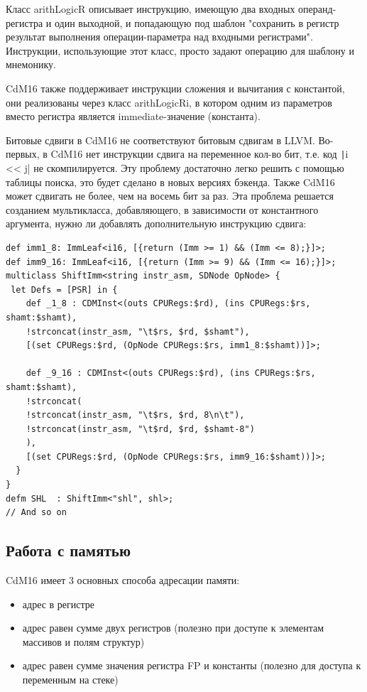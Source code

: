 \documentclass[a4paper,14pt]{extarticle}
\begin{document}
Класс arithLogicR описывает инструкцию, имеющую два входных операнд-регистра и один выходной, и попадающую под шаблон "сохранить в регистр результат выполнения операции-параметра над входными регистрами". Инструкции, использующие этот класс, просто задают операцию для шаблону и мнемонику.

CdM16 также поддерживает инструкции сложения и вычитания с константой, они реализованы через класс arithLogicRi, в котором одним из параметров вместо регистра является immediate-значение (константа).

Битовые сдвиги в CdM16 не соответствуют битовым сдвигам в LLVM. Во-первых, в CdM16 нет инструкции сдвига на переменное кол-во бит, т.е. код \texttt|i << j| не скомпилируется. Эту проблему достаточно легко решить с помощью таблицы поиска, это будет сделано в новых версиях бэкенда. Также CdM16 может сдвигать не более, чем на восемь бит за раз. Эта проблема решается созданием мультикласса, добавляющего, в зависимости от константного аргумента, нужно ли добавлять дополнительную инструкцию сдвига:
\begin{verbatim}
def imm1_8: ImmLeaf<i16, [{return (Imm >= 1) && (Imm <= 8);}]>;
def imm9_16: ImmLeaf<i16, [{return (Imm >= 9) && (Imm <= 16);}]>;
multiclass ShiftImm<string instr_asm, SDNode OpNode> {
 let Defs = [PSR] in {
	def _1_8 : CDMInst<(outs CPURegs:$rd), (ins CPURegs:$rs, shamt:$shamt),
	!strconcat(instr_asm, "\t$rs, $rd, $shamt"),
	[(set CPURegs:$rd, (OpNode CPURegs:$rs, imm1_8:$shamt))]>;
	
	def _9_16 : CDMInst<(outs CPURegs:$rd), (ins CPURegs:$rs, shamt:$shamt),
	!strconcat(
	!strconcat(instr_asm, "\t$rs, $rd, 8\n\t"),
	!strconcat(instr_asm, "\t$rd, $rd, $shamt-8")
	),
	[(set CPURegs:$rd, (OpNode CPURegs:$rs, imm9_16:$shamt))]>;
  }
}
defm SHL  : ShiftImm<"shl", shl>;
// And so on
\end{verbatim}

\subsection{Работа с памятью}
CdM16 имеет 3 основных способа адресации памяти:
\begin{itemize}
	\item адрес в регистре
	\item адрес равен сумме двух регистров (полезно при доступе к элементам массивов и полям структур)
	\item адрес равен сумме значения регистра FP и константы (полезно для доступа к переменным на стеке)
\end{itemize}
\end{document}
